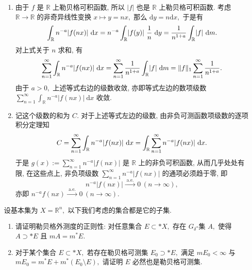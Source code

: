 \begin{solution}
\begin{enumerate}
\item 由于 $f$ 是 $\mathbb{R}$ 上勒贝格可积函数, 所以 $\lvert f \rvert$ 也是 $\mathbb{R}$ 上勒贝格可积函数. 
考虑 $\mathbb{R} \to \mathbb{R}$ 的非奇异线性变换 $x \mapsto y = nx,$ 那么 $\mathrm{d} y = n \mathrm{d} x,$ 
于是有
\begin{equation*}
\int_{\mathbb{R}} n^{-a} \lvert f(nx) \rvert ~ \mathrm{d} x = n^{-a} \int_{\mathbb{R}} \lvert f(y) \rvert ~ \dfrac{1}{n} ~ \mathrm{d} y
= \dfrac{1}{n^{1 + a}} \int_{\mathbb{R}} \lvert f \rvert ~ \mathrm{d} m. \score{2}
\end{equation*}
对上式关于 $n$ 求和, 有
\begin{equation*}
\sum_{n = 1}^\infty \int_{\mathbb{R}} n^{-a} \lvert f(nx) \rvert ~ \mathrm{d} x
= \sum_{n = 1}^\infty \dfrac{1}{n^{1 + a}} \int_{\mathbb{R}} \lvert f \rvert ~ \mathrm{d} m
= \lVert f \rVert_1 \sum_{n = 1}^\infty \dfrac{1}{n^{1 + a}}. \score{2}
\end{equation*}
由于 $a > 0,$ 上述等式右边的级数收敛, 亦即等式左边的数项级数 $\sum_{n = 1}^\infty \int_{\mathbb{R}} n^{-a} \lvert f(nx) \rvert ~ \mathrm{d} x$ 收敛.

\item 记这个级数的和为 $C.$ 对于上述等式左边的级数, 由非负可测函数项级数的逐项积分定理知
\begin{equation*}
C = \sum_{n = 1}^\infty \int_{\mathbb{R}} n^{-a} \lvert f(nx) \rvert ~ \mathrm{d} x
= \int_{\mathbb{R}} \sum_{n = 1}^\infty n^{-a} \lvert f(nx) \rvert ~ \mathrm{d} x. \score{2}
\end{equation*}
于是 $\displaystyle g(x) := \sum_{n = 1}^\infty n^{-a} \lvert f(nx) \rvert$ 是 $\mathbb{R}$ 上的非负可积函数, 从而几乎处处有限, 
在这些点上, 非负项级数 $\displaystyle \sum_{n = 1}^\infty n^{-a} \lvert f(nx) \rvert$ 的通项必须趋于零, 即
\begin{equation*}
n^{-a} \lvert f(nx) \rvert \xrightarrow{\text{~a.e.~}} 0 ~ (n \to \infty),
\end{equation*}
亦即 $\displaystyle n^{-a} f(nx) \xrightarrow{\text{~a.e.~}} 0 ~ (n \to \infty).$ 
\end{enumerate}
\end{solution}


\begin{question}[points = 10]
设基本集为 $X = \mathbb{R}^n,$ 以下我们考虑的集合都是它的子集.
\begin{enumerate}
\item 请证明勒贝格外测度的正则性: 对任意集合 $E \subset* X,$ 存在 $G_{\delta}$-集 $A,$ 使得 $A \supset* E$ 且 $m A = m^* E.$
\item 对于某个集合 $E \subset* X,$ 若存在勒贝格可测集 $E_0 \supset* E,$ 满足 $m E_0 < \infty$ 与 $m E_0 = m^* E + m^* (E_0 \setminus E),$ 请证明 $E$ 必然也是勒贝格可测集.
\end{enumerate}

\end{question}

